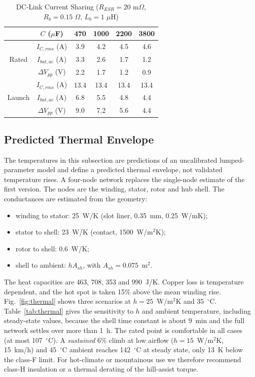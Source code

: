 \documentclass[journal]{IEEEtran}
\begin{document}
\begin{table}[!t]
\caption{DC-Link Current Sharing ($R_{ESR}=20$ m$\Omega$, $R_b=0.15$ $\Omega$, $L_b=1$ $\mu$H)}
\label{tab:dclink}
\centering
\renewcommand{\arraystretch}{1.08}
\setlength{\tabcolsep}{3.5pt}
\begin{tabular}{c c c c c c}
\hline
 & $C$ ($\mu$F) & 470 & 1000 & 2200 & 3800\\
\hline
\multirow{3}{*}{Rated} & $I_{C,rms}$ (A) & 3.9 & 4.2 & 4.5 & 4.6\\
 & $I_{bat,ac}$ (A) & 3.3 & 2.6 & 1.7 & 1.2\\
 & $\Delta V_{pp}$ (V) & 2.2 & 1.7 & 1.2 & 0.9\\
\hline
\multirow{3}{*}{Launch} & $I_{C,rms}$ (A) & 13.4 & 13.4 & 13.4 & 13.4\\
 & $I_{bat,ac}$ (A) & 6.8 & 5.5 & 4.8 & 4.4\\
 & $\Delta V_{pp}$ (V) & 9.0 & 7.2 & 5.6 & 4.4\\
\hline
\end{tabular}
\end{table}

\subsection{Predicted Thermal Envelope}
\label{sec:thermal}
The temperatures in this subsection are predictions of an uncalibrated
lumped-parameter model and define a predicted thermal envelope, not validated
temperature rises. A four-node network replaces the single-node estimate of the first version.
The nodes are the winding, stator, rotor and hub shell. The conductances are
estimated from the geometry:
\begin{itemize}
\item winding to stator: 25~W/K (slot liner, 0.35~mm, 0.25~W/mK);
\item stator to shell: 23~W/K (contact, 1500~W/m$^2$K);
\item rotor to shell: 0.6~W/K;
\item shell to ambient: $hA_{sh}$, with $A_{sh}=0.075$~m$^2$.
\end{itemize}
The heat capacities are 463, 708, 353 and 990~J/K. Copper loss is
temperature dependent, and the hot spot is taken 15\% above the mean winding
rise. Fig.~\ref{fig:thermal} shows three scenarios at $h=25$~W/m$^2$K and
35~$^\circ$C. Table~\ref{tab:thermal} gives the sensitivity to $h$ and ambient
temperature, including steady-state values, because the shell time constant is
about 9~min and the full network settles over more than 1~h. The rated point
is comfortable in all cases (at most 107~$^\circ$C). A \emph{sustained} 6\%
climb at low airflow ($h=15$~W/m$^2$K, 15~km/h) and 45~$^\circ$C ambient
reaches 142~$^\circ$C at steady state, only 13~K below the class-F limit. For
hot-climate or mountainous use we therefore recommend class-H insulation or a
thermal derating of the hill-assist torque.
\end{document}
